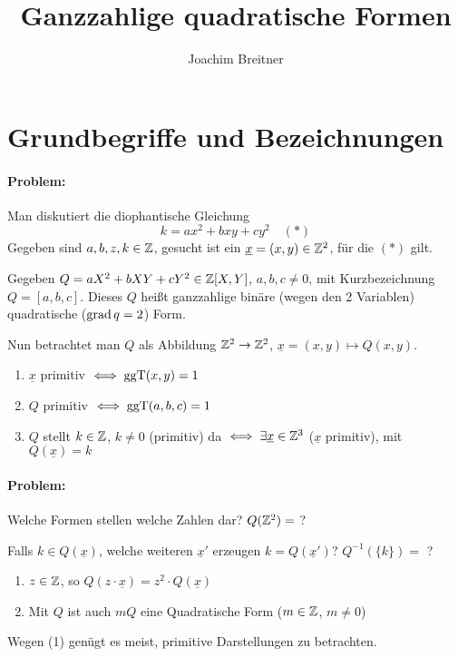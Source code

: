 \documentclass[a4paper,DIV15,BCOR12mm]{article}
\title{Ganzzahlige quadratische Formen}
\author{Joachim Breitner}
\begin{document}
\maketitle

\section{Grundbegriffe und Bezeichnungen}

\paragraph{Problem:} Man diskutiert die diophantische Gleichung
\[ k = ax^2 + bxy + cy^2 \quad (*)\]
Gegeben sind $a,b,z,k \in\mathbb{Z}$, gesucht ist ein $\underline{x} = (x,y)\in\mathbb{Z}^2$, für die $(*)$ gilt.

Gegeben $Q=aX^2+bXY+cY^2 \in \mathbb{Z}[X,Y]$, $a,b,c \ne 0$, mit Kurzbezeichnung $Q=[a,b,c]$. Dieses $Q$ heißt ganzzahlige binäre (wegen den 2 Variablen) quadratische ($\mathop{\rm grad}\nolimits q=2$) Form.

Nun betrachtet man $Q$ als Abbildung $\mathbb{Z}^2 \to \mathbb{Z}^2$, $\underline x = (x,y) \mapsto Q(x,y)$.

\begin{definition}
\begin{enumerate}
\item $\underline x$ primitiv $\iff \mathop{\rm ggT}\nolimits(x,y)=1$
\item $Q$ primitiv $\iff \mathop{\rm ggT}\nolimits(a,b,c) = 1$
\item $Q$ stellt $k\in\mathbb{Z}$, $k\ne 0$ (primitiv) da $\iff \exists \underline x \in \mathbb{Z}^3$ ($\underline x$ primitiv), mit $Q(\underline x) = k$
\end{enumerate}
\end{definition}

\paragraph{Problem:} Welche Formen stellen welche Zahlen dar? $Q(\mathbb{Z}^2) =$ ?

Falls $k\in Q(\underline x)$, welche weiteren $\underline x'$ erzeugen $k=Q(\underline x')$? $Q^{-1}(\{k\})=$ ?

\begin{bemerkung}
\begin{enumerate}
\item $z\in\mathbb{Z}$, so $Q(z\cdot \underline x)= z^2 \cdot Q(\underline x)$
\item Mit $Q$ ist auch $mQ$ eine Quadratische Form ($m\in\mathbb{Z}$, $m\ne 0$)
\end{enumerate}
Wegen (1) genügt es meist, primitive Darstellungen zu betrachten.
\end{bemerkung}
\end{document}
